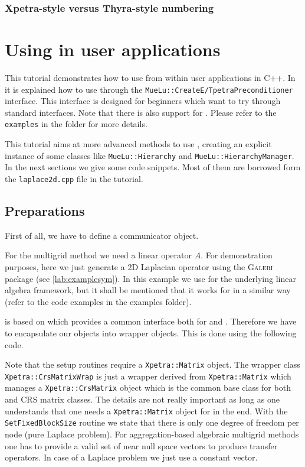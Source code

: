 \documentclass[10pt,fleqn]{book}
\providecommand\printCppListing[1]{

}
\begin{document}
\subsection{Xpetra-style versus Thyra-style numbering}
\label{sec:xpetraversusthyra}


\chapter{Using \muelu in user applications}

This tutorial demonstrates how to use \muelu from within user applications in C++. In \cite[Section 2.6]{Mue} it is explained how to use \muelu through the \texttt{MueLu::CreateE/TpetraPreconditioner} interface. This interface is designed for beginners which want to try \muelu through standard \trilinos interfaces. Note that there is also support for \stratimikos. Please refer to the \texttt{examples} in the \muelu folder for more details.

This tutorial aims at more advanced methods to use \muelu, creating an explicit instance of some \muelu classes like \texttt{MueLu::Hierarchy} and \texttt{MueLu::HierarchyManager}. In the next sections we give some code snippets. Most of them are borrowed form the \texttt{laplace2d.cpp} file in the tutorial.

\section{Preparations}
First of all, we have to define a communicator object.
\printCppListing{laplace2d.cpp_2.fragment}

For the multigrid method we need a linear operator $A$. For demonstration purposes, here we just generate a 2D Laplacian operator using the \textsc{Galeri} package (see \ref{lab:examplesym}). In this example we use \epetra for the underlying linear algebra framework, but it shall be mentioned that it works for \tpetra in a similar way (refer to the code examples in the \muelu examples folder).
\printCppListing{laplace2d.cpp_4.fragment}

\muelu is based on \xpetra which provides a common interface both for \epetra and \tpetra. Therefore we have to encapsulate our \epetra objects into \xpetra wrapper objects. This is done using the following code.
\printCppListing{laplace2d.cpp_6.fragment}
Note that the \muelu setup routines require a \texttt{Xpetra::Matrix} object. The wrapper class \texttt{Xpetra::CrsMatrixWrap} is just a wrapper derived from \texttt{Xpetra::Matrix} which manages a \texttt{Xpetra::CrsMatrix} object which is the common base class for both \epetra and \tpetra CRS matrix classes. The details are not really important as long as one understands that one needs a \texttt{Xpetra::Matrix} object for \muelu in the end.
With the \texttt{SetFixedBlockSize} routine we state that there is only one degree of freedom per node (pure Laplace problem).
For aggregation-based algebraic multigrid methods one has to provide a valid set of near null space vectors to produce transfer operators. In case of a Laplace problem we just use a constant vector.
\printCppListing{laplace2d.cpp_8.fragment}
\end{document}
